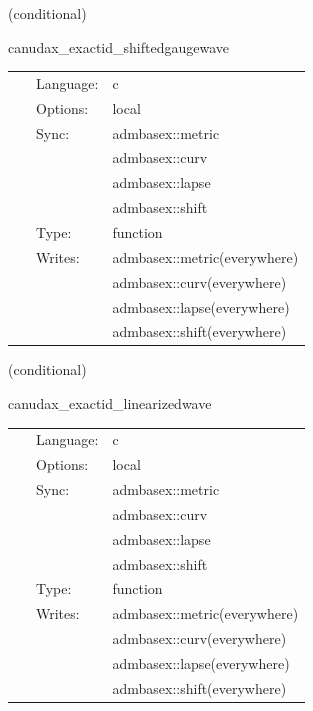 \vspace{5mm}

   (conditional) 

\hspace{5mm} canudax\_exactid\_shiftedgaugewave 

\hspace{5mm}{\it create shifted gauge wave initial data } 


\hspace{5mm}

 \begin{tabular*}{160mm}{cll} 
~ & Language:  & c \\ 
~ & Options:  & local \\ 
~ & Sync:  & admbasex::metric \\ 
~& ~ &admbasex::curv\\ 
~& ~ &admbasex::lapse\\ 
~& ~ &admbasex::shift\\ 
~ & Type:  & function \\ 
~ & Writes:  & admbasex::metric(everywhere) \\ 
~& ~ &admbasex::curv(everywhere)\\ 
~& ~ &admbasex::lapse(everywhere)\\ 
~& ~ &admbasex::shift(everywhere)\\ 
\end{tabular*} 


\vspace{5mm}

   (conditional) 

\hspace{5mm} canudax\_exactid\_linearizedwave 

\hspace{5mm}{\it create linearized wave initial data } 


\hspace{5mm}

 \begin{tabular*}{160mm}{cll} 
~ & Language:  & c \\ 
~ & Options:  & local \\ 
~ & Sync:  & admbasex::metric \\ 
~& ~ &admbasex::curv\\ 
~& ~ &admbasex::lapse\\ 
~& ~ &admbasex::shift\\ 
~ & Type:  & function \\ 
~ & Writes:  & admbasex::metric(everywhere) \\ 
~& ~ &admbasex::curv(everywhere)\\ 
~& ~ &admbasex::lapse(everywhere)\\ 
~& ~ &admbasex::shift(everywhere)\\ 
\end{tabular*} 


